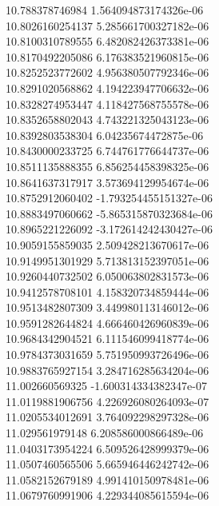 {10.788378746984 1.564094873174326e-06 \\
10.8026160254137 5.285661700327182e-06 \\
10.8100310789555 6.482082426373381e-06 \\
10.8170492205086 6.176383521960815e-06 \\
10.8252523772602 4.956380507792346e-06 \\
10.8291020568862 4.194223947706632e-06 \\
10.8328274953447 4.118427568755578e-06 \\
10.8352658802043 4.743221325043123e-06 \\
10.8392803538304 6.04235674472875e-06 \\
10.8430000233725 6.744761776644737e-06 \\
10.8511135888355 6.856254458398325e-06 \\
10.8641637317917 3.573694129954674e-06 \\
10.8752912060402 -1.793254455151327e-06 \\
10.8883497060662 -5.865315870323684e-06 \\
10.8965221226092 -3.172614242430427e-06 \\
10.9059155859035 2.509428213670617e-06 \\
10.9149951301929 5.713813152397051e-06 \\
10.9260440732502 6.050063802831573e-06 \\
10.9412578708101 4.158320734859444e-06 \\
10.9513482807309 3.449980113146012e-06 \\
10.9591282644824 4.666460426960839e-06 \\
10.9684342904521 6.111546099418774e-06 \\
10.9784373031659 5.751950993726496e-06 \\
10.9883765927154 3.284716285634204e-06 \\
11.002660569325 -1.600314334382347e-07 \\
11.0119881906756 4.226926080264093e-07 \\
11.0205534012691 3.764092298297328e-06 \\
11.029561979148 6.208586000866489e-06 \\
11.0403173954224 6.509526428999379e-06 \\
11.0507460565506 5.665946446242742e-06 \\
11.0582152679189 4.991410150978481e-06 \\
11.0679760991906 4.229344085615594e-06 \\
}
